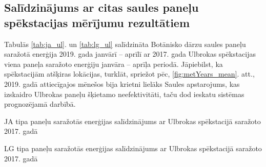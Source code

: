 \subsection{Salīdzinājums ar citas saules paneļu spēkstacijas mērījumu rezultātiem}

Tabulās \ref{tab:ja_ul}. un \ref{tab:lg_ul} salīdzināta Botānisko dārzu saules paneļu saražotā enerģija 2019. gada janvārī -- aprīlī ar 2017. gada Ulbrokas spēkstacijas viena paneļa saražoto enerģiju janvāra -- aprīļa periodā. Jāpiebilst, ka spēkstacijām atšķiras lokācijas, turklāt, spriežot pēc, \ref{fig:metYears_mean}. att., 2019. gadā attiecīgajos mēnešos bija krietni lielāks Saules apstarojums, kas izskaidro Ulbrokas paneļu šķietamo neefektivitāti, taču dod ieskatu sistēmas prognozējamā darbībā.
\begin{table}[h]
    \caption{JA tipa paneļu saražotās enerģijas salīdzinājums ar Ulbrokas spēkstacijā saražoto 2017. gadā}
    \begin{center}
    
    \end{center} \label{tab:ja_ul}
\end{table}
\begin{table}[h]
    \caption{LG tipa paneļu saražotās enerģijas salīdzinājums ar Ulbrokas spēkstacijā saražoto 2017. gadā}
    \begin{center}
    
    \end{center}\label{tab:lg_ul}
\end{table}